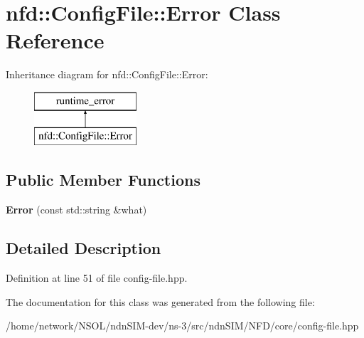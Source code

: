 \hypertarget{classnfd_1_1ConfigFile_1_1Error}{}\section{nfd\+:\+:Config\+File\+:\+:Error Class Reference}
\label{classnfd_1_1ConfigFile_1_1Error}
Inheritance diagram for nfd\+:\+:Config\+File\+:\+:Error\+:\begin{figure}[H]
\begin{center}
\leavevmode
\includegraphics[height=2.000000cm]{classnfd_1_1ConfigFile_1_1Error}
\end{center}
\end{figure}
\subsection*{Public Member Functions}
\begin{DoxyCompactItemize}
\item 
{\bfseries Error} (const std\+::string \&what)\hypertarget{classnfd_1_1ConfigFile_1_1Error_ade71cfa2c7e6b7ca96d2e12fd9166781}{}\label{classnfd_1_1ConfigFile_1_1Error_ade71cfa2c7e6b7ca96d2e12fd9166781}

\end{DoxyCompactItemize}


\subsection{Detailed Description}


Definition at line 51 of file config-\/file.\+hpp.



The documentation for this class was generated from the following file\+:\begin{DoxyCompactItemize}
\item 
/home/network/\+N\+S\+O\+L/ndn\+S\+I\+M-\/dev/ns-\/3/src/ndn\+S\+I\+M/\+N\+F\+D/core/config-\/file.\+hpp\end{DoxyCompactItemize}
